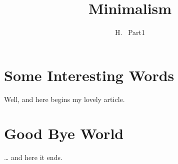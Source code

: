 \documentclass[a4paper, 11pt]{article}
\author{H. ~Part1}
\title{Minimalism}
\begin{document}
\maketitle
\tableofcontents
\section{Some Interesting Words}
Well, and here begins my lovely article.
\section{Good Bye World}
\ldots{} and here it ends.
\end{document}
